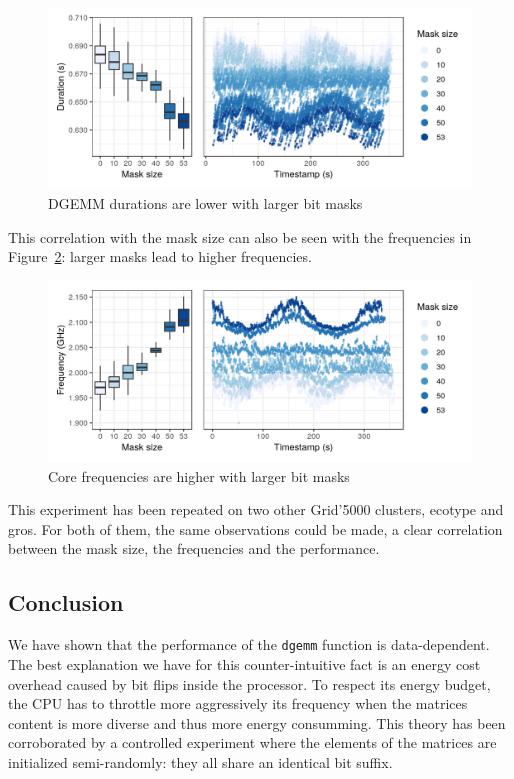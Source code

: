             \begin{figure}[htbp]
                \centering
                \includegraphics[width=\textwidth]{img/experiment/bit-flips/mask_size_perf.png}
                \caption{\label{fig:exp:bit-flips:mask-perf}
                DGEMM durations are lower with larger bit masks}
            \end{figure}

            This correlation with the mask size can also be seen with the frequencies in
            Figure~\ref{fig:exp:bit-flips:mask-freq}: larger masks lead to higher frequencies.

            \begin{figure}[htbp]
                \centering
                \includegraphics[width=\textwidth]{img/experiment/bit-flips/mask_size_freq.png}
                \caption{\label{fig:exp:bit-flips:mask-freq}
                Core frequencies are higher with larger bit masks}
            \end{figure}

            This experiment has been repeated on two other Grid'5000 clusters, ecotype and gros. For both of them, the
            same observations could be made, a clear correlation between the mask size, the frequencies and the
            performance.

        \subsection{Conclusion}
            We have shown that the performance of the \texttt{dgemm} function is data-dependent. The best explanation we
            have for this counter-intuitive fact is an energy cost overhead caused by bit flips inside the processor.
            To respect its energy budget, the CPU has to throttle more aggressively its frequency when the matrices
            content is more diverse and thus more energy consumming.
            This theory has been corroborated by a controlled experiment where the elements of the matrices are
            initialized semi-randomly: they all share an identical bit suffix.

